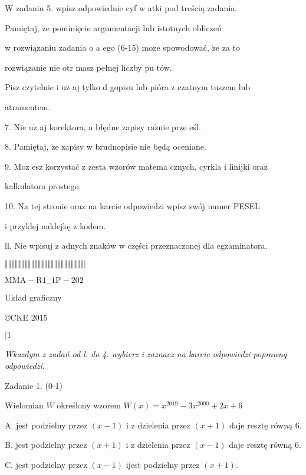 \documentclass[a4paper,12pt]{article}
\begin{document}
$\mathrm{W}$ zadaniu 5. wpisz odpowiednie cyf w atki pod treścią zadania.

Pamiętaj, $\dot{\mathrm{z}}\mathrm{e}$ pominięcie argumentacji lub istotnych obliczeń

w rozwiązaniu zadania o a ego (6-15) $\mathrm{m}\mathrm{o}\dot{\mathrm{z}}\mathrm{e}$ spowodować, $\dot{\mathrm{z}}\mathrm{e}$ za to

rozwiązanie nie otr masz pełnej liczby pu tów.

Pisz czytelnie i $\mathrm{u}\dot{\mathrm{z}}$ aj tylko $\mathrm{d}$ gopisu lub pióra z czatnym tuszem lub

atramentem.

7. Nie $\mathrm{u}\dot{\mathrm{z}}$ aj korektora, a błędne zapisy $\mathrm{r}\mathrm{a}\acute{\mathrm{z}}\mathrm{n}\mathrm{i}\mathrm{e}$ prze eśl.

8. Pamiętaj, $\dot{\mathrm{z}}\mathrm{e}$ zapisy w brudnopisie nie będą oceniane.

9. $\mathrm{M}\mathrm{o}\dot{\mathrm{z}}$ esz korzystać z zesta wzorów matema cznych, cyrkla i linijki oraz

kalkulatora prostego.

10. Na tej stronie oraz na karcie odpowiedzi wpisz swój numer PESEL

i przyklej naklejkę z kodem.

ll. Nie wpisuj $\dot{\mathrm{z}}$ adnych znaków w części przeznaczonej dla egzaminatora.

$\Vert\Vert\Vert\Vert\Vert\Vert\Vert\Vert\Vert\Vert\Vert\Vert\Vert\Vert\Vert\Vert\Vert\Vert\Vert\Vert\Vert\Vert\Vert\Vert|$

$\mathrm{M}\mathrm{M}\mathrm{A}-\mathrm{R}1_{-}1\mathrm{P}-202$

Układ graficzny

\copyright CKE 2015

$| 1$




{\it Wkazdym z zadań od l. do 4. wybierz i zaznacz na karcie odpowiedzi poprawnq odpowiedzí}.

Zadanie 1. (0-1)

Wielomian $W$ określony wzorem $W(x)=x^{2019}-3x^{2000}+2x+6$

A. jest podzielny przez $(x-1)$ i z dzielenia przez $(x+1)$ daje resztę równą 6.

B. jest podzielny przez $(x+1)$ i z dzielenia przez $(x-1)$ daje resztę równą 6.

C. jest podzielny przez $(x-1)$ ijest podzielny przez $(x+1).$
\end{document}
